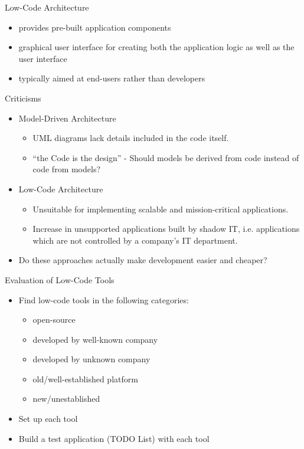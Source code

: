\documentclass[aspectratio=169]{beamer}
\begin{document}
  \begin{frame}{Low-Code Architecture}
    \begin{itemize}
      \item provides pre-built application components
      \item graphical user interface for creating both the
            application logic as well as the user interface
      \item typically aimed at end-users rather than developers
    \end{itemize}
  \end{frame}

  \begin{frame}{Criticisms}
    \begin{itemize}
      \item Model-Driven Architecture
        \begin{itemize}
          \item UML diagrams lack details included in the code itself.
          \item “the Code is the design” - Should models be derived from code instead of code from models?
        \end{itemize}
      \item Low-Code Architecture
        \begin{itemize}
          \item Unsuitable for implementing scalable and mission-critical applications.
          \item Increase in unsupported applications built by shadow IT,
                i.e. applications which are not controlled by a company's IT department.
        \end{itemize}
      \item Do these approaches actually make development easier and cheaper?
    \end{itemize}
  \end{frame}

  \begin{frame}{Evaluation of Low-Code Tools}
    \begin{itemize}
      \item Find low-code tools in the following categories:
          \begin{itemize}
            \item open-source
            \item developed by well-known company
            \item developed by unknown company
            \item old/well-established platform
            \item new/unestablished
          \end{itemize}
      \item Set up each tool
      \item Build a test application (TODO List) with each tool
    \end{itemize}
  \end{frame}
\end{document}
